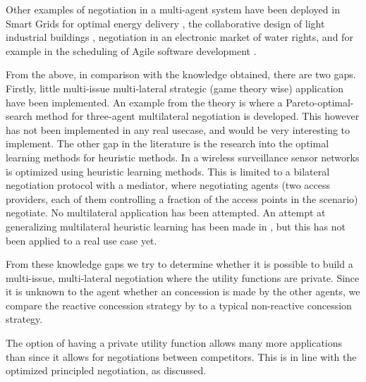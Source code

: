 Other examples of negotiation in a multi-agent system have been deployed in Smart Grids for optimal energy delivery \citep{pipattanasomporn2009multi}, the collaborative design of light industrial buildings \citep{anumba2003negotiation}, negotiation in an electronic market of water rights, and for example in the scheduling of Agile software development \citep{rabelo1999multi}.

From the above, in comparison with the knowledge obtained, there are two gaps. Firstly, little multi-issue multi-lateral strategic (game theory wise) application have been implemented. An example from the theory is \citet{wu2009efficient} where a Pareto-optimal-search method for three-agent multilateral negotiation is developed. This however has not been implemented in any real usecase, and would be very interesting to implement. The other gap in the literature is the research into the optimal learning methods for heuristic methods. In \citet{de2015automated} a wireless surveillance sensor networks is optimized using heuristic learning methods. This is limited to a bilateral negotiation protocol with a mediator, where negotiating agents (two access providers, each of them controlling a fraction of the access points in the scenario) negotiate. No multilateral application has been attempted. An attempt at generalizing multilateral heuristic learning has been made in \citet{beheshti2014homan}, but this has not been applied to a real use case yet. 

From these knowledge gaps we try to determine whether it is possible to build a multi-issue, multi-lateral negotiation where the utility functions are private. Since it is unknown to the agent whether an concession is made by the other agents, we compare the reactive concession strategy by \citet{zheng2015automated} to a typical non-reactive concession strategy.

The option of having a private utility function allows many more applications than since it allows for negotiations between competitors. This is in line with the optimized principled negotiation, as discussed.